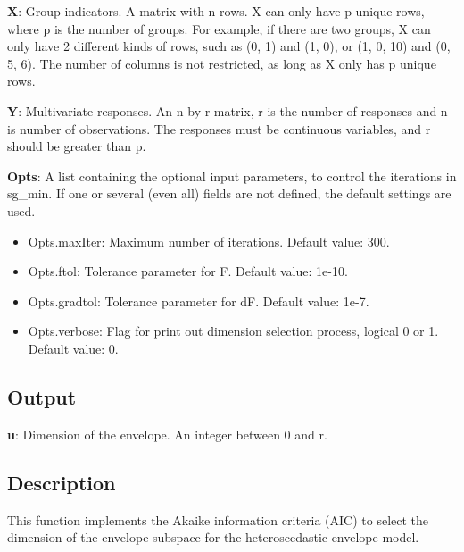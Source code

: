 \documentclass[a4paper,11pt,openany]{memoir}
\begin{document}
\begin{par}
\textbf{X}: Group indicators. A matrix with n rows.  X can only have p unique  rows, where p is the number of groups. For example, if there are two groups, X can only have 2 different kinds of rows, such as (0, 1) and (1, 0), or (1, 0, 10) and (0, 5, 6).  The number of columns is not restricted, as long as X only has p unique rows.
\end{par} \vspace{1em}
\begin{par}
\textbf{Y}: Multivariate responses. An n by r matrix, r is the number of responses and n is number of observations. The responses must be continuous variables, and r should be greater than p.
\end{par} \vspace{1em}
\begin{par}
\textbf{Opts}: A list containing the optional input parameters, to control the iterations in sg\_min. If one or several (even all) fields are not defined, the default settings are used.
\end{par} \vspace{1em}
\begin{itemize}
\setlength{\itemsep}{-1ex}
   \item Opts.maxIter: Maximum number of iterations.  Default value: 300.
   \item Opts.ftol: Tolerance parameter for F.  Default value: 1e-10.
   \item Opts.gradtol: Tolerance parameter for dF.  Default value: 1e-7.
   \item Opts.verbose: Flag for print out dimension selection process, logical 0 or 1. Default value: 0.
\end{itemize}


\subsection*{Output}

\begin{par}
\textbf{u}: Dimension of the envelope. An integer between 0 and r.
\end{par} \vspace{1em}


\subsection*{Description}

\begin{par}
This function implements the Akaike information criteria (AIC) to select the dimension of the envelope subspace for the heteroscedastic envelope model.
\end{par} \vspace{1em}
\end{document}
